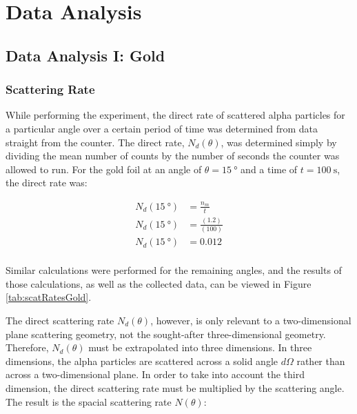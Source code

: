 \documentclass[a4paper]{article}
\begin{document}
\section{Data Analysis}

\subsection{Data Analysis I: Gold}

\subsubsection{Scattering Rate}

\qq While performing the experiment, the direct rate of scattered alpha
particles for a particular angle over a certain period of time was determined
from data straight from the counter. The direct rate, \( N_d (\theta) \), was
determined simply by dividing the mean number of counts by the number of seconds
the counter was allowed to run. For the gold foil at an angle of
\( \theta = \SI{15}{\degree} \) and a time of \( t = \SI{100}{\second} \), the
direct rate was:

\begin{align*}
  N_d (\SI{15}{\degree}) &= \frac{n_m}{t} \\
  N_d (\SI{15}{\degree}) &= \frac{(1.2)}{(100)} \\
  N_d (\SI{15}{\degree}) &= \num{0.012} \\
\end{align*}

Similar calculations were performed for the remaining angles, and the results of
those calculations, as well as the collected data, can be viewed in Figure
\ref{tab:scatRatesGold}.

\qq The direct scattering rate \( N_d (\theta) \), however, is only relevant to
a two-dimensional plane scattering geometry, not the sought-after
three-dimensional geometry. Therefore, \( N_d (\theta) \) must be extrapolated
into three dimensions. In three dimensions, the alpha particles are scattered
across a solid angle \( d\Omega \) rather than across a two-dimensional
plane. In order to take into account the third dimension, the direct scattering
rate must be multiplied by the scattering angle. The result is the spacial
scattering rate \( N (\theta) \):
\end{document}
